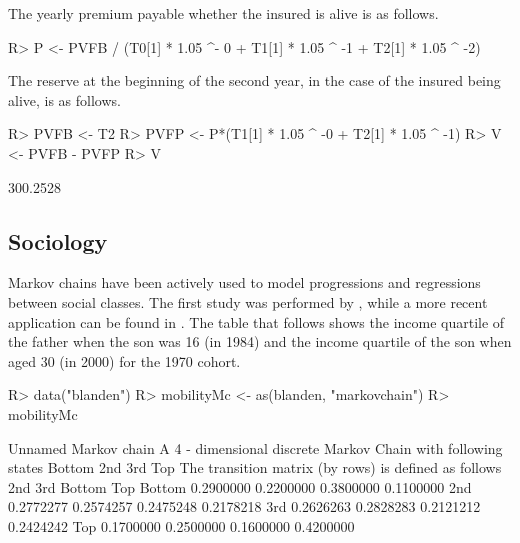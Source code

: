 \documentclass[nojss]{jss}
\begin{document}
The yearly premium payable whether the insured is alive is as follows. 

\begin{Schunk}
\begin{Sinput}
R> P <- PVFB / (T0[1] * 1.05 ^- 0 + T1[1] * 1.05 ^ -1 + T2[1] * 1.05 ^ -2)
\end{Sinput}
\end{Schunk}

The reserve at the beginning of the second year, in the case of the insured being alive, is as follows.

\begin{Schunk}
\begin{Sinput}
R> PVFB <- T2 %
R> PVFP <- P*(T1[1] * 1.05 ^ -0 + T2[1] * 1.05 ^ -1)
R> V <- PVFB - PVFP
R> V
\end{Sinput}
\begin{Soutput}
         [,1]
[1,] 300.2528
\end{Soutput}
\end{Schunk}

\subsection{Sociology}\label{app:sociology}

Markov chains have been actively used to model progressions and regressions between social classes. The first study was performed by \cite{glassHall}, while a more recent application can be found in \cite{blandenEtAlii}. The table that follows shows the income quartile of the father when the son was 16 (in 1984) and the income quartile of the son when aged 30 (in 2000) for the 1970 cohort.

\begin{Schunk}
\begin{Sinput}
R> data("blanden")
R> mobilityMc <- as(blanden, "markovchain")
R> mobilityMc
\end{Sinput}
\begin{Soutput}
Unnamed Markov chain 
 A  4 - dimensional discrete Markov Chain with following states 
 Bottom 2nd 3rd Top 
 The transition matrix   (by rows)  is defined as follows 
             2nd       3rd    Bottom       Top
Bottom 0.2900000 0.2200000 0.3800000 0.1100000
2nd    0.2772277 0.2574257 0.2475248 0.2178218
3rd    0.2626263 0.2828283 0.2121212 0.2424242
Top    0.1700000 0.2500000 0.1600000 0.4200000
\end{Soutput}
\end{Schunk}
\end{document}
